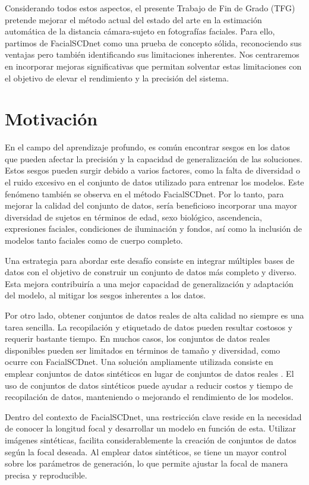 Considerando todos estos aspectos, el presente Trabajo de Fin de Grado (TFG) pretende mejorar el método actual del estado del arte en la estimación automática de la distancia cámara-sujeto en fotografías faciales. Para ello, partimos de FacialSCDnet como una prueba de concepto sólida, reconociendo sus ventajas pero también identificando sus limitaciones inherentes. Nos centraremos en incorporar mejoras significativas que permitan solventar estas limitaciones con el objetivo de elevar el rendimiento y la precisión del sistema.

\section{Motivación}

En el campo del aprendizaje profundo, es común encontrar sesgos en los datos que pueden afectar la precisión y la capacidad de generalización de las soluciones. Estos sesgos pueden surgir debido a varios factores, como la falta de diversidad o el ruido excesivo en el conjunto de datos utilizado para entrenar los modelos. Este fenómeno también se observa en el método FacialSCDnet.
Por lo tanto, para mejorar la calidad del conjunto de datos, sería beneficioso incorporar una mayor diversidad de sujetos en términos de edad, sexo biológico, ascendencia, expresiones faciales, condiciones de iluminación y fondos, así como la inclusión de modelos tanto faciales como de cuerpo completo. 

Una estrategia para abordar este desafío consiste en integrar múltiples bases de datos con el objetivo de construir un conjunto de datos más completo y diverso. Esta mejora contribuiría a una mejor capacidad de generalización y adaptación del modelo, al mitigar los sesgos inherentes a los datos.

Por otro lado, obtener conjuntos de datos reales de alta calidad no siempre es una tarea sencilla. La recopilación y etiquetado de datos pueden resultar costosos y requerir bastante tiempo. En muchos casos, los conjuntos de datos reales disponibles pueden ser limitados en términos de tamaño y diversidad, como ocurre con FacialSCDnet.
Una solución ampliamente utilizada consiste en emplear conjuntos de datos sintéticos en lugar de conjuntos de datos reales \cite{57,58,59}.
El uso de conjuntos de datos sintéticos puede ayudar a reducir costos y tiempo de recopilación de datos, manteniendo o mejorando el rendimiento de los modelos.

Dentro del contexto de FacialSCDnet, una restricción clave reside en la necesidad de conocer la longitud focal y desarrollar un modelo en función de esta. Utilizar imágenes sintéticas, facilita considerablemente la creación de conjuntos de datos según la focal deseada.
Al emplear datos sintéticos, se tiene un mayor control sobre los parámetros de generación, lo que permite ajustar la focal de manera precisa y reproducible.

